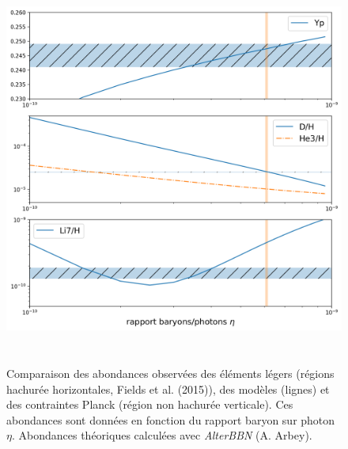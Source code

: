 \begin{figure}[htbp]
	\centering
		\includegraphics[height=13cm]{figs/BBN.png}
		\caption[Comparaison des abondances observées des éléments légers]{Comparaison des abondances observées des éléments légers (régions hachurée horizontales, Fields et al. (2015)), des modèles (lignes) et des contraintes Planck (région non hachurée verticale). Ces abondances sont données en fonction du rapport baryon sur photon  $\eta$. Abondances théoriques calculées avec \textit{AlterBBN} (A. Arbey).}
	\label{f:nucle}
\end{figure}
